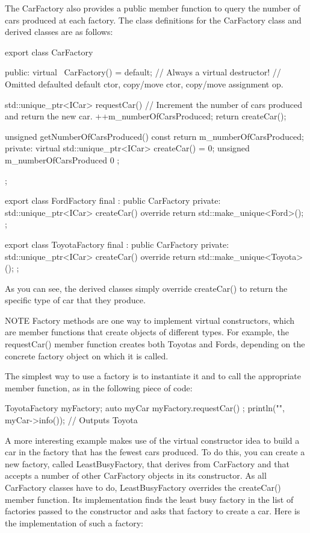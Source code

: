The CarFactory also provides a public member function to query the number of cars produced at each factory. The class definitions for the CarFactory class and derived classes are as follows:

\begin{cpp}
export class CarFactory
{
    public:
        virtual ~CarFactory() = default; // Always a virtual destructor!
        // Omitted defaulted default ctor, copy/move ctor, copy/move assignment op.

        std::unique_ptr<ICar> requestCar()
        {
            // Increment the number of cars produced and return the new car.
            ++m_numberOfCarsProduced;
            return createCar();
        }

        unsigned getNumberOfCarsProduced() const { return m_numberOfCarsProduced; }
    private:
        virtual std::unique_ptr<ICar> createCar() = 0;
        unsigned m_numberOfCarsProduced { 0 };
};

export class FordFactory final : public CarFactory
{
    private:
        std::unique_ptr<ICar> createCar() override {
            return std::make_unique<Ford>(); }
};

export class ToyotaFactory final : public CarFactory
{
    private:
        std::unique_ptr<ICar> createCar() override {
            return std::make_unique<Toyota>(); }
};
\end{cpp}

As you can see, the derived classes simply override createCar() to return the specific type of car that they produce.

\begin{myNotic}{NOTE}
Factory methods are one way to implement virtual constructors, which are member functions that create objects of different types. For example, the requestCar() member function creates both Toyotas and Fords, depending on the concrete factory object on which it is called.
\end{myNotic}


The simplest way to use a factory is to instantiate it and to call the appropriate member function, as in the following piece of code:

\begin{cpp}
ToyotaFactory myFactory;
auto myCar { myFactory.requestCar() };
println("{}", myCar->info()); // Outputs Toyota
\end{cpp}

A more interesting example makes use of the virtual constructor idea to build a car in the factory that has the fewest cars produced. To do this, you can create a new factory, called LeastBusyFactory, that derives from CarFactory and that accepts a number of other CarFactory objects in its constructor. As all CarFactory classes have to do, LeastBusyFactory overrides the createCar() member function. Its implementation finds the least busy factory in the list of factories passed to the constructor and asks that factory to create a car. Here is the implementation of such a factory:

